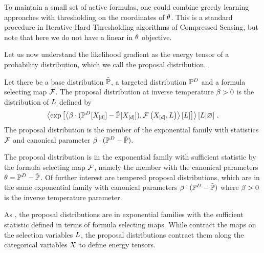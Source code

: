\begin{remark}
    To maintain a small set of active formulas, one could combine greedy learning approaches with thresholding on the coordinates of $\theta$.
    This is a standard procedure in Iterative Hard Thresholding algorithms of Compressed Sensing, but note that here we do not have a linear in $\theta$ objective.
\end{remark}






Let us now understand the likelihood gradient as the energy tensor of a probability distribution, which we call the proposal distribution.

\begin{definition}
    Let there be a base distribution $\tilde{\mathbb{P}}$, a targeted distribution $\mathbb{P}^{D}$ and a formula selecting map $\mathcal{F}$.
    The proposal distribution at inverse temperature $\beta>0$ is the distribution of $L$ defined by
    \begin{align*}
        \left\langle \mathrm{exp}\left[\left\langle \beta\cdot(\mathbb{P}^{D}[X_{[d]}]-\tilde{\mathbb{P}}[X_{[d]}]),\mathcal{F}\left(X_{[d]},L\right)\right\rangle \left[ L \right]\right] \right\rangle \left[ L | \varnothing \right] \, .
    \end{align*}
    The proposal distribution is the member of the exponential family with statistics $\mathcal{F}$ and canonical parameter $\beta\cdot(\mathbb{P}^{D}-\tilde{\mathbb{P}})$.
\end{definition}


The proposal distribution is in the exponential family with sufficient statistic by the formula selecting map $\mathcal{F}$, namely the member with the canonical parameters $\theta=\mathbb{P}^{D}-\tilde{\mathbb{P}}$.
Of further interest are tempered proposal distributions, which are in the same exponential family with canonical parameters $\beta\cdot(\mathbb{P}^{D}-\tilde{\mathbb{P}})$ where $\beta>0$ is the inverse temperature parameter.

As \MarkovLogicNetworks{}, the proposal distributions are in exponential families with the sufficient statistic defined in terms of formula selecting maps.
While \MarkovLogicNetworks{} contract the maps on the selection variables $L$, the proposal distributions contract them along the categorical variables $X$ to define energy tensors.

